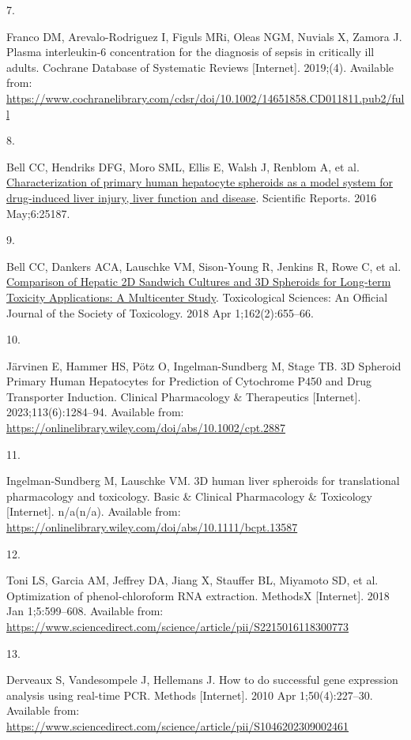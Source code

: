 \documentclass[
  letterpaper,
  DIV=11,
  numbers=noendperiod,
  oneside]{scrartcl}
\newlength{\cslhangindent}
\newlength{\csllabelwidth}
\newenvironment{CSLReferences}[2] %
 {\begin{list}{}{%
  \setlength{\itemindent}{0pt}
  \setlength{\leftmargin}{0pt}
  \setlength{\parsep}{0pt}
  \ifodd #1
   \setlength{\leftmargin}{\cslhangindent}
   \setlength{\itemindent}{-1\cslhangindent}
  \fi
  \setlength{\itemsep}{#2\baselineskip}}}
 {\end{list}}
\newcommand{\CSLLeftMargin}[1]{\parbox[t]{\csllabelwidth}{\strut#1\strut}}
\newcommand{\CSLRightInline}[1]{\parbox[t]{\linewidth - \csllabelwidth}{\strut#1\strut}}
\begin{document}
\begin{CSLReferences}{0}{1}
\CSLLeftMargin{7. }%
\CSLRightInline{Franco DM, Arevalo-Rodriguez I, Figuls MRi, Oleas NGM,
Nuvials X, Zamora J. Plasma interleukin{-}6 concentration for the
diagnosis of sepsis in critically ill adults. Cochrane Database of
Systematic Reviews {[}Internet{]}. 2019;(4). Available from:
\url{https://www.cochranelibrary.com/cdsr/doi/10.1002/14651858.CD011811.pub2/full}}

\CSLLeftMargin{8. }%
\CSLRightInline{Bell CC, Hendriks DFG, Moro SML, Ellis E, Walsh J,
Renblom A, et al.
\href{https://doi.org/10.1038/srep25187}{Characterization of primary
human hepatocyte spheroids as a model system for drug-induced liver
injury, liver function and disease}. Scientific Reports. 2016
May;6:25187. }

\CSLLeftMargin{9. }%
\CSLRightInline{Bell CC, Dankers ACA, Lauschke VM, Sison-Young R,
Jenkins R, Rowe C, et al.
\href{https://doi.org/10.1093/toxsci/kfx289}{Comparison of Hepatic 2D
Sandwich Cultures and 3D Spheroids for Long-term Toxicity Applications:
A Multicenter Study}. Toxicological Sciences: An Official Journal of the
Society of Toxicology. 2018 Apr 1;162(2):655--66. }

\CSLLeftMargin{10. }%
\CSLRightInline{Järvinen E, Hammer HS, Pötz O, Ingelman-Sundberg M,
Stage TB. 3D Spheroid Primary Human Hepatocytes for Prediction of
Cytochrome P450 and Drug Transporter Induction. Clinical Pharmacology \&
Therapeutics {[}Internet{]}. 2023;113(6):1284--94. Available from:
\url{https://onlinelibrary.wiley.com/doi/abs/10.1002/cpt.2887}}

\CSLLeftMargin{11. }%
\CSLRightInline{Ingelman-Sundberg M, Lauschke VM. 3D human liver
spheroids for translational pharmacology and toxicology. Basic \&
Clinical Pharmacology \& Toxicology {[}Internet{]}. n/a(n/a). Available
from: \url{https://onlinelibrary.wiley.com/doi/abs/10.1111/bcpt.13587}}

\CSLLeftMargin{12. }%
\CSLRightInline{Toni LS, Garcia AM, Jeffrey DA, Jiang X, Stauffer BL,
Miyamoto SD, et al. Optimization of phenol-chloroform RNA extraction.
MethodsX {[}Internet{]}. 2018 Jan 1;5:599--608. Available from:
\url{https://www.sciencedirect.com/science/article/pii/S2215016118300773}}

\CSLLeftMargin{13. }%
\CSLRightInline{Derveaux S, Vandesompele J, Hellemans J. How to do
successful gene expression analysis using real-time PCR. Methods
{[}Internet{]}. 2010 Apr 1;50(4):227--30. Available from:
\url{https://www.sciencedirect.com/science/article/pii/S1046202309002461}}


\end{CSLReferences}
\end{document}
